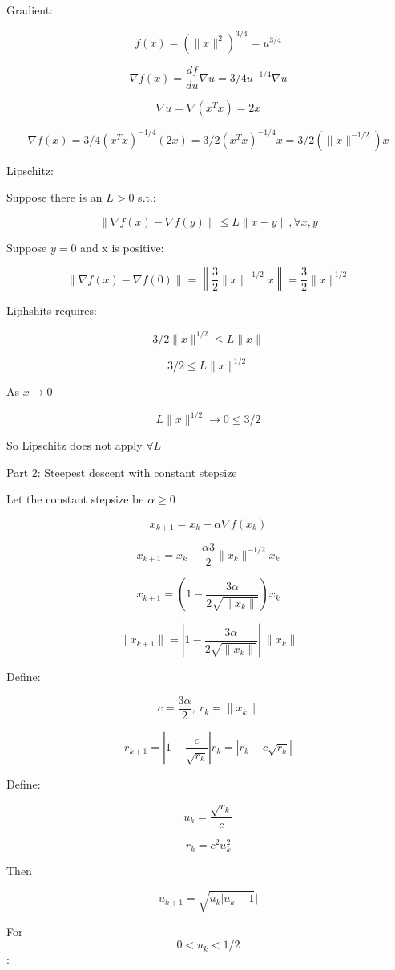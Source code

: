 \documentclass[11pt,letterpaper]{article}
\begin{document}
\begin{enumerate}
	Gradient:

	\[ f(x) = (\|x\|^2)^{3/4} = u^{3/4} \]

	\[ \nabla f(x) = \frac{df}{du} \nabla u 
	= 3/4 u^{-1/4} \nabla u \]    

	\[ \nabla u = \nabla (x^T x) = 2x \]

	\[ \nabla f(x) = 3/4(x^T x)^{-1/4} (2x) 
	= 3/2(x^T x)^{-1/4} x
	= 3/2 (\|x\|^{-1/2})x\]

	Lipschitz:

	Suppose there is an $L > 0$ s.t.:

	\[ \| \nabla f(x) - \nabla f(y) \| \leq
	L \|x - y\|, \forall x,y \]

	Suppose $y = 0$ and x is positive:

	\[
	\|\nabla f(x)-\nabla f(0)\|
	=
	\left\|\frac{3}{2}\|x\|^{-1/2}x\right\|
	=
	\frac{3}{2}\|x\|^{1/2}
	\]

	Liphshits requires:

	\[ 3/2 \|x\|^{1/2} \leq L\|x\| \]

	\[ 3/2 \leq L \|x\|^{1/2} \]

	As $x \rightarrow 0$

	\[ L \|x\|^{1/2} \rightarrow 0 \leq    
	3/2 \]

	So Lipschitz does not apply $\forall L$

	Part 2: Steepest descent with constant stepsize

	Let the constant stepsize be $\alpha \geq 0$

	\[ x_{k+1} = x_k - \alpha \nabla f(x_k)\]

	\[ x_{k+1} = 
	x_k - \frac{\alpha 3}{2} \|x_k\|^{-1/2} x_k\]

	\[ x_{k+1} = 
	\left( 
	1 - \frac{3 \alpha}{2 \sqrt{\|x_k\|}} 
	\right) x_k
	\]

	\[
	\|x_{k+1}\| = 
	|{1 - \frac{3 \alpha}{2 \sqrt{\|x_k\|}}}| \ \|x_k\|
	\] 

	Define:

	\[ c = \frac{3 \alpha}{2}, \ r_k = \|x_k\| \]

	\[ r_{k+1} = |1 - \frac{c}{\sqrt{r_k}}| r_k = 
	|r_k - c \sqrt{r_k}| \]   

	Define:

	\[ u_k = \frac{\sqrt{r_k}}{c} \]

	\[ r_k = c^2 u_k^2 \]

	Then

	\[ u_{k+1} = \sqrt{u_k |u_k - 1}| \]

	For \[ 0 < u_k < 1/2 \]:


\end{enumerate}
\end{document}
